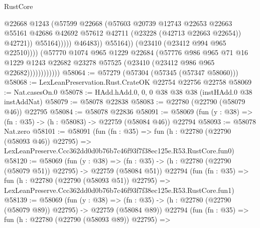 \begin{lexlean}{RustCore}
\begin{coremodule}
                                          @22668
                                          @1243
                                          (@57599
                                            @22668
                                            (@57603
                                              @20739
                                              @12743
                                              @22653
                                              @22663
                                              @55161
                                              @42686
                                              @42692
                                              @57612
                                              @42711
                                              (@23228 (@42713 @22663 @22654))
                                              @42721))
                                          @55164)))))
                                @46483))
                            @55164))
                        (@23410 (@23412 @994 @965 @22510))))
                    (@57770
                      @1074
                      @965
                      @1229
                      @22684
                      (@57776
                        @986
                        @965
                        @71
                        @16
                        @1229
                        @1243
                        @22682
                        @23278
                        @57525
                        (@23410 (@23412 @986 @965 @22682))))))))))))
@58064 := @57279 (@57304 (@57345 (@57347 @58060)))
@58068 := LexLeanPreservation.Rust.CrateOK @22754 @22756 @22758
@58069 := Nat.casesOn.{0}
@58078 := HAdd.hAdd.{0, 0, 0} @38 @38 @38 (instHAdd.{0} @38 instAddNat)
@58079 := @58078 @22838
@58083 := @22780 (@22790 (@58079 @46)) @22795
@58084 := @58078 @22836
@58091 := @58069 (fun (y : @38) => (fn : @35) -> (h : @58083) -> @22759 (@58084 @46)) @22794
@58093 := @58078 Nat.zero
@58101 := @58091
    (fun (fn : @35) =>
    fun (h : @22780 (@22790 (@58093 @46)) @22795) =>
    LexLeanPreserve.Ccc362dd0d0b76b7c46f93f7f38ec125e.R53.RustCore.fun0)
@58120 := @58069
    (fun (y : @38) =>
    (fn : @35) -> (h : @22780 (@22790 (@58079 @51)) @22795) -> @22759 (@58084 @51))
    @22794
    (fun (fn : @35) =>
    fun (h : @22780 (@22790 (@58093 @51)) @22795) =>
    LexLeanPreserve.Ccc362dd0d0b76b7c46f93f7f38ec125e.R53.RustCore.fun1)
@58139 := @58069
    (fun (y : @38) =>
    (fn : @35) -> (h : @22780 (@22790 (@58079 @89)) @22795) -> @22759 (@58084 @89))
    @22794
    (fun (fn : @35) =>
    fun (h : @22780 (@22790 (@58093 @89)) @22795) =>

\end{coremodule}
\end{lexlean}
